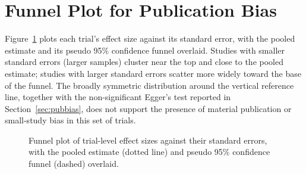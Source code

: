 \section{Funnel Plot for Publication Bias}
\label{app:funnel}

Figure~\ref{fig:funnel} plots each trial's effect size against its standard error, with the
pooled estimate and its pseudo 95\% confidence funnel overlaid. Studies with smaller
standard errors (larger samples) cluster near the top and close to the pooled estimate;
studies with larger standard errors scatter more widely toward the base of the funnel. The
broadly symmetric distribution around the vertical reference line, together with the
non-significant Egger's test reported in Section~\ref{sec:pubbias}, does not support the presence of
material publication or small-study bias in this set of trials.

\begin{figure}[htbp]
\centering
{}
\caption{Funnel plot of trial-level effect sizes against their standard errors, with the
pooled estimate (dotted line) and pseudo 95\% confidence funnel (dashed) overlaid.}
\label{fig:funnel}
\end{figure}
